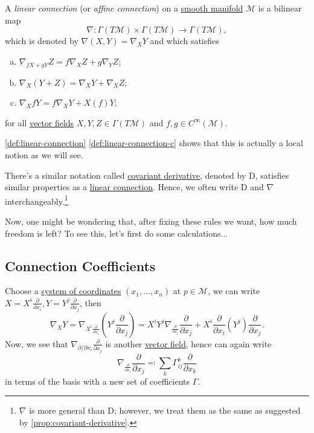 \begin{definition}\label{def:linear-connection}
	A \emph{linear connection} (or \emph{affine connection}) on a \hyperref[def:smooth-manifold]{smooth manifold} \(\mathcal{M}\) is a bilinear map
	\[
		\nabla \colon \Gamma (T \mathcal{M} ) \times \Gamma (T \mathcal{M} ) \to \Gamma (T \mathcal{M} ),
	\]
	which is denoted by \(\nabla (X, Y) = \nabla _X Y\) and which satisfies
	\begin{enumerate}[(a)]
		\item \(\nabla _{fX+gY}Z = f \nabla _X Z + g \nabla _Y Z\);
		\item \(\nabla _X (Y+Z) = \nabla _X Y + \nabla _X Z\);
		\item\label{def:linear-connection-c} \(\nabla _X fY = f \nabla _X Y + X(f)Y\);
	\end{enumerate}
	for all \hyperref[def:vector-field]{vector fields} \(X, Y, Z\in \Gamma (T \mathcal{M} )\) and \(f, g\in C^{\infty} (\mathcal{M} )\).
\end{definition}

\begin{remark}
	\autoref{def:linear-connection} \autoref{def:linear-connection-c} shows that this is actually a local notion as we will see.
\end{remark}

\begin{note}
	There's a similar notation called \hyperref[def:covariant-derivative]{covariant derivative}, denoted by \(\mathrm{D} \), satisfies similar properties as a \hyperref[def:linear-connection]{linear connection}. Hence, we often write \(\mathrm{D} \) and \(\nabla \) interchangeably.\footnote{\(\nabla \) is more general than \(\mathrm{D}\); however, we treat them as the same as suggested by \autoref{prop:covariant-derivative}.}
\end{note}

Now, one might be wondering that, after fixing these rules we want, how much freedom is left? To see this, let's first do some calculations...

\subsection{Connection Coefficients}
Choose a \hyperref[def:coordinate-chart]{system of coordinates} \((x_1, \dots , x_n)\) at \(p\in \mathcal{M} \), we can write \(X = X^i \frac{\partial }{\partial x_i}, Y = Y^j \frac{\partial }{\partial x_j}\), then
\[
	\nabla _X Y
	= \nabla _{X^i \frac{\partial }{\partial x_i} } \left( Y^j \frac{\partial }{\partial x_j} \right)
	= X^i Y^j \nabla _{\frac{\partial }{\partial x_i}} \frac{\partial }{\partial x_j} + X^i \frac{\partial }{\partial x_i}(Y^j) \frac{\partial }{\partial x_j}.
\]
Now, we see that \(\nabla _{\partial / \partial x_i} \frac{\partial }{\partial x_j}\) is another \hyperref[def:vector-field]{vector field}, hence can again write
\[
	\nabla _{\frac{\partial }{\partial x_i}} \frac{\partial }{\partial x_j} \eqqcolon \sum_{k} \Gamma ^k_{ij} \frac{\partial }{\partial x_k}
\]
in terms of the basis with a new set of coefficients \(\Gamma \).

